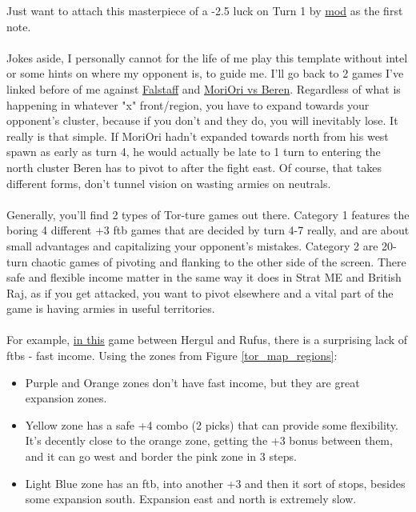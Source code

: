 Just want to attach this masterpiece of a -2.5 luck on Turn 1 by \href{https://www.warzone.com/MultiPlayer?GameID=38361962}{mod} as the first note. 
\\
\\
Jokes aside, I personally cannot for the life of me play this template without intel or some hints on where my opponent is, to guide me. I'll go back to 2 games I've linked before of me against \href{https://www.warzone.com/MultiPlayer?GameID=41111396}{Falstaff} and \href{https://www.warzone.com/MultiPlayer?GameID=33047568}{MoriOri vs Beren}. Regardless of what is happening in whatever "x" front/region, you have to expand towards your opponent's cluster, because if you don't and they do, you will inevitably lose. It really is that simple. If MoriOri hadn't expanded towards north from his west spawn as early as turn 4, he would actually be late to 1 turn to entering the north cluster Beren has to pivot to after the fight east. Of course, that takes different forms, don't tunnel vision on wasting armies on neutrals.
\\
\\
Generally, you'll find 2 types of Tor-ture games out there. Category 1 features the boring 4 different +3 ftb games that are decided by turn 4-7 really, and are about small advantages and capitalizing your opponent's mistakes. Category 2 are 20-turn chaotic games of pivoting and flanking to the other side of the screen. There safe and flexible income matter in the same way it does in Strat ME and British Raj, as if you get attacked, you want to pivot elsewhere and a vital part of the game is having armies in useful territories.
\\
\\
For example, \href{https://www.warzone.com/MultiPlayer?GameID=39273878}{in this} game between Hergul and Rufus, there is a surprising lack of ftbs - fast income. Using the zones from Figure \ref{tor_map_regions}:
\begin{itemize}
    \item Purple and Orange zones don't have fast income, but they are great expansion zones.
    \item Yellow zone has a safe +4 combo (2 picks) that can provide some flexibility. It's decently close to the orange zone, getting the +3 bonus between them, and it can go west and border the pink zone in 3 steps.
    \item Light Blue zone has an ftb, into another +3 and then it sort of stops, besides some expansion south. Expansion east and north is extremely slow.
\end{itemize}

